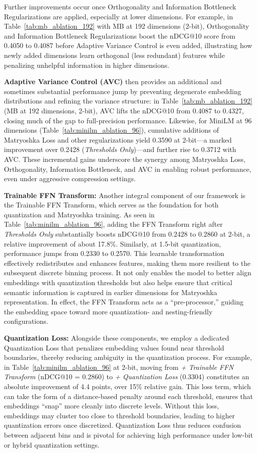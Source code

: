 Further improvements occur once Orthogonality and Information Bottleneck Regularizations are applied, especially at lower dimensions. 
For example, in Table~\ref{tab:mb_ablation_192} with MB at 192 dimensions (2-bit), Orthogonality and Information Bottleneck Regularizations boost the nDCG@10 score from 0.4050 to 0.4087 before Adaptive Variance Control is even added, illustrating how newly added dimensions learn orthogonal (less redundant) features while penalizing unhelpful information in higher dimensions.

\textbf{Adaptive Variance Control (AVC)} then provides an additional and sometimes substantial performance jump by preventing degenerate embedding distributions and refining the variance structure: 
in Table~\ref{tab:mb_ablation_192} (MB at 192 dimensions, 2-bit), AVC lifts the nDCG@10 from 0.4087 to 0.4327, closing much of the gap to full-precision performance. 
Likewise, for MiniLM at 96 dimensions (Table~\ref{tab:minilm_ablation_96}), cumulative additions of Matryoshka Loss and other regularizations yield 0.3590 at 2-bit—a marked improvement over 0.2428 (\textit{Thresholds Only})—and further rise to 0.3712 with AVC. 
These incremental gains underscore the synergy among Matryoshka Loss, Orthogonality, Information Bottleneck, and AVC in enabling robust performance, even under aggressive compression settings.

\textbf{Trainable FFN Transform:}
Another integral component of our framework is the Trainable FFN Transform, which serves as the foundation for both quantization and Matryoshka training. 
As seen in Table~\ref{tab:minilm_ablation_96}, adding the FFN Transform right after \textit{Thresholds Only} substantially boosts nDCG@10 from 0.2428 to 0.2860 at 2-bit, a relative improvement of about 17.8\%. 
Similarly, at 1.5-bit quantization, performance jumps from 0.2330 to 0.2570. 
This learnable transformation effectively redistributes and enhances features, making them more resilient to the subsequent discrete binning process. 
It not only enables the model to better align embeddings with quantization thresholds but also helps ensure that critical semantic information is captured in earlier dimensions for Matryoshka representation. 
In effect, the FFN Transform acts as a “pre-processor,” guiding the embedding space toward more quantization- and nesting-friendly configurations.

\textbf{Quantization Loss:}
Alongside these components, we employ a dedicated Quantization Loss that penalizes embedding values found near threshold boundaries, thereby reducing ambiguity in the quantization process. 
For example, in Table~\ref{tab:minilm_ablation_96} at 2-bit, moving from \textit{+ Trainable FFN Transform} (nDCG@10 = 0.2860) to \textit{+ Quantization Loss} (0.3304) constitutes an absolute improvement of 4.4 points, over 15\% relative gain. 
This loss term, which can take the form of a distance-based penalty around each threshold, ensures that embeddings “snap” more cleanly into discrete levels. 
Without this loss, embeddings may cluster too close to threshold boundaries, leading to higher quantization errors once discretized. 
Quantization Loss thus reduces confusion between adjacent bins and is pivotal for achieving high performance under low-bit or hybrid quantization settings.

